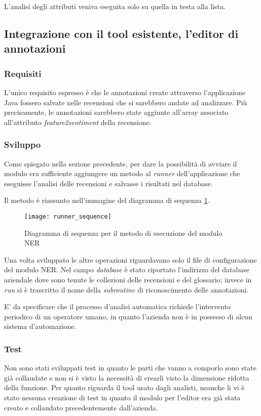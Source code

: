 L'analisi degli attributi veniva eseguita solo su quella in testa alla lista.

\subsection{Integrazione con il tool esistente, l'editor di annotazioni}
\subsubsection{Requisiti}
L'unico requisito espresso è che le annotazioni create attraverso l'applicazione
Java fossero salvate nelle recensioni che si sarebbero andate ad analizzare.
Più precisamente, le annotazioni sarebbero state aggiunte all'array associato
all'attributo \textit{feature2sentiment} della recensione.

\subsubsection{Sviluppo}
Come spiegato nella sezione precedente, per dare la possibilità di avviare il
modulo era sufficiente aggiungere un metodo al \textit{runner} dell'applicazione
che eseguisse l'analisi delle recensioni e salvasse i risultati nel database.

Il metodo è riassunto nell'immagine del diagramma di sequenza
\ref{fig:runner_sequence}.

\begin{figure}[t]
\begin{center}
\texttt{[image: runner\_sequence]}
\caption{
Diagramma di sequenza per il metodo di esecuzione del modulo NER
}
\label{fig:runner_sequence}
\end{center}
\end{figure}

Una volta sviluppato le altre operazioni riguardavano solo il file di
configurazione del modulo \gls{NER}. Nel campo \textit{database} è stato
riportato l'indirizzo del database aziendale dove sono tenute le collezioni
delle recensioni e del glossario; invece in \textit{run} si è trascritto il nome
della \textit{subroutine} di riconoscimento delle annotazioni.

E' da specificare che il processo d'analisi automatica richiede l'intervento
periodico di un operatore umano, in quanto l'azienda non è in possesso di alcun
sistema d'automazione.

\subsubsection{Test}
Non sono stati sviluppati test in quanto le parti che vanno a comporlo sono
state già collaudate e non si è visto la necessità di crearli visto la
dimensione ridotta della funzione. Per quanto riguarda il tool usato dagli
analisti, neanche li vi è stato nessuna creazione di test in quanto il modulo
per l'editor era già stata creato e collaudato precedentemente dall'azienda.

